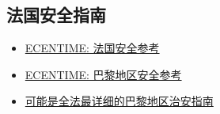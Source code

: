\subsection{法国安全指南}

\begin{itemize}
    \item \href{https://www.ecentime.com/article/security-guide-in-france}{ECENTIME: 法国安全参考}
    \item \href{https://www.ecentime.com/article/securite-arrondissement}{ECENTIME: 巴黎地区安全参考}
    \item \href{https://mp.weixin.qq.com/s/EOGbefPAPmCXaiPJtq32Gw}{可能是全法最详细的巴黎地区治安指南}
\end{itemize}

